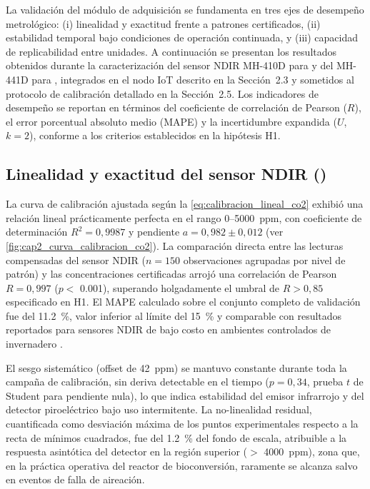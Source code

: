 
La validación del módulo de adquisición se fundamenta en tres ejes de desempeño metrológico: (i) linealidad y exactitud frente a patrones certificados, (ii) estabilidad temporal bajo condiciones de operación continuada, y (iii) capacidad de replicabilidad entre unidades. A continuación se presentan los resultados obtenidos durante la caracterización del sensor NDIR MH-410D para  y del MH-441D para , integrados en el nodo IoT descrito en la Sección~2.3 y sometidos al protocolo de calibración detallado en la Sección~2.5. Los indicadores de desempeño se reportan en términos del coeficiente de correlación de Pearson ($R$), el error porcentual absoluto medio (MAPE) y la incertidumbre expandida ($U$, $k=2$), conforme a los criterios establecidos en la hipótesis H1.

\subsection{Linealidad y exactitud del sensor NDIR ()}
\label{subsec:cap2_resultados_co2}

La curva de calibración ajustada según la \cref{eq:calibracion_lineal_co2} exhibió una relación lineal prácticamente perfecta en el rango \num{0}--\num{5000}~ppm, con coeficiente de determinación $R^2 = 0{,}9987$ y pendiente $a = 0{,}982 \pm 0{,}012$ (ver \cref{fig:cap2_curva_calibracion_co2}). La comparación directa entre las lecturas compensadas del sensor NDIR ($n = 150$ observaciones agrupadas por nivel de patrón) y las concentraciones certificadas arrojó una correlación de Pearson $R = 0{,}997$ ($p <$ \num{0.001}), superando holgadamente el umbral de $R > 0{,}85$ especificado en H1. El MAPE calculado sobre el conjunto completo de validación fue del \SI{11.2}{\percent}, valor inferior al límite del \SI{15}{\percent} y comparable con resultados reportados para sensores NDIR de bajo costo en ambientes controlados de invernadero \parencite{biagiDevelopmentMachineLearningbased2024a, yavariArtEMonArtificialIntelligence2023}.

El sesgo sistemático (offset de \SI{42}{ppm}) se mantuvo constante durante toda la campaña de calibración, sin deriva detectable en el tiempo ($p = 0{,}34$, prueba $t$ de Student para pendiente nula), lo que indica estabilidad del emisor infrarrojo y del detector piroeléctrico bajo uso intermitente. La no-linealidad residual, cuantificada como desviación máxima de los puntos experimentales respecto a la recta de mínimos cuadrados, fue del \SI{1.2}{\percent} del fondo de escala, atribuible a la respuesta asintótica del detector en la región superior ($>$ \SI{4000}{ppm}), zona que, en la práctica operativa del reactor de bioconversión, raramente se alcanza salvo en eventos de falla de aireación.

